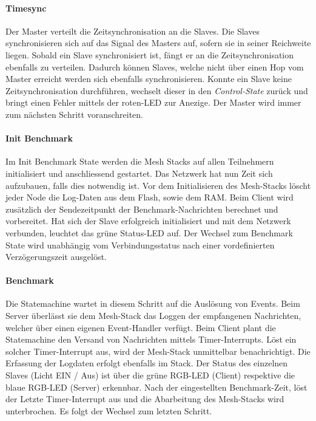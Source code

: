 \paragraph{Timesync}
Der Master verteilt die Zeitsynchronisation an die Slaves. Die Slaves synchronisieren sich auf das Signal des Masters auf, sofern sie in seiner Reichweite liegen. Sobald ein Slave synchronisiert ist, fängt er an die Zeitsynchronisation ebenfalls zu verteilen. Dadurch können Slaves, welche nicht über einen Hop vom Master erreicht werden sich ebenfalls synchronisieren. Konnte ein Slave keine Zeitsynchronisation durchführen, wechselt dieser in den  \textit{Control-State} zurück und bringt einen Fehler mittels der roten-LED zur Anezige. Der Master wird immer zum nächsten Schritt voranschreiten. 	

\paragraph{Init Benchmark}
Im Init Benchmark State werden die Mesh Stacks auf allen Teilnehmern initialisiert und anschliessend gestartet.
Das Netzwerk hat nun Zeit sich aufzubauen, falls dies notwendig ist.
Vor dem Initialisieren des Mesh-Stacks löscht jeder Node die Log-Daten aus dem Flash, sowie dem RAM.
Beim Client wird zusätzlich der Sendezeitpunkt der Benchmark-Nachrichten berechnet und vorbereitet.
Hat sich der Slave erfolgreich initialisiert und mit dem Netzwerk verbunden, leuchtet das grüne Status-LED auf.
Der Wechsel zum Benchmark State wird unabhängig vom Verbindungsstatus nach einer vordefinierten Verzögerungszeit ausgelöst.

\paragraph{Benchmark}
Die Statemachine wartet in diesem Schritt auf die Auslösung von Events.
Beim Server überlässt sie dem Mesh-Stack das Loggen der empfangenen Nachrichten, welcher über einen eigenen Event-Handler verfügt.
Beim Client plant die Statemachine den Versand von Nachrichten mittels Timer-Interrupts.
Löst ein solcher Timer-Interrupt aus, wird der Mesh-Stack unmittelbar benachrichtigt.
Die Erfassung der Logdaten erfolgt ebenfalls im Stack.
Der Status des einzelnen Slaves (Licht EIN / Aus) ist über die grüne RGB-LED (Client) respektive die blaue RGB-LED (Server) erkennbar.
Nach der eingestellten Benchmark-Zeit, löst der Letzte Timer-Interrupt aus und die Abarbeitung des Mesh-Stacks wird unterbrochen.
Es folgt der Wechsel zum letzten Schritt.

